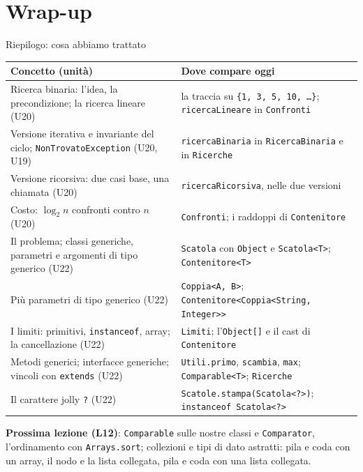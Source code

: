 \documentclass[10pt,aspectratio=169,xcolor={table}]{beamer}
\begin{document}
\section{Wrap-up}

\begin{frame}{Riepilogo: cosa abbiamo trattato}
\footnotesize
\begin{center}
\renewcommand{\arraystretch}{1.1}
\scriptsize
\begin{tabular}{|>{\raggedright\arraybackslash}p{6.4cm}|>{\raggedright\arraybackslash}p{7.4cm}|}
\hline
\textbf{Concetto (unità)} & \textbf{Dove compare oggi} \\
\hline
Ricerca binaria: l'idea, la precondizione; la ricerca lineare (U20) & la traccia su \texttt{\{1, 3, 5, 10, \ldots\}}; \texttt{ricercaLineare} in \texttt{Confronti} \\
\hline
Versione iterativa e invariante del ciclo; \texttt{NonTrovatoException} (U20, U19) & \texttt{ricercaBinaria} in \texttt{RicercaBinaria} e in \texttt{Ricerche} \\
\hline
Versione ricorsiva: due casi base, una chiamata (U20) & \texttt{ricercaRicorsiva}, nelle due versioni \\
\hline
Costo: $\log_2 n$ confronti contro $n$ (U20) & \texttt{Confronti}; i raddoppi di \texttt{Contenitore} \\
\hline
Il problema; classi generiche, parametri e argomenti di tipo generico (U22) & \texttt{Scatola} con \texttt{Object} e \texttt{Scatola<T>}; \texttt{Contenitore<T>} \\
\hline
Più parametri di tipo generico (U22) & \texttt{Coppia<A, B>}; \texttt{Contenitore<Coppia<String, Integer>>} \\
\hline
I limiti: primitivi, \texttt{instanceof}, array; la cancellazione (U22) & \texttt{Limiti}; l'\texttt{Object[]} e il cast di \texttt{Contenitore} \\
\hline
Metodi generici; interfacce generiche; vincoli con \texttt{extends} (U22) & \texttt{Utili.primo}, \texttt{scambia}, \texttt{max}; \texttt{Comparable<T>}; \texttt{Ricerche} \\
\hline
Il carattere jolly \texttt{?} (U22) & \texttt{Scatole.stampa(Scatola<?>)}; \texttt{instanceof Scatola<?>} \\
\hline
\end{tabular}
\end{center}

\vspace{0.1cm}
\textbf{Prossima lezione (L12)}: \texttt{Comparable} sulle nostre classi e \texttt{Comparator}, l'ordinamento con \texttt{Arrays.sort}; collezioni e tipi di dato astratti: pila e coda con un array, il nodo e la lista collegata, pila e coda con una lista collegata.
\end{frame}
\end{document}
